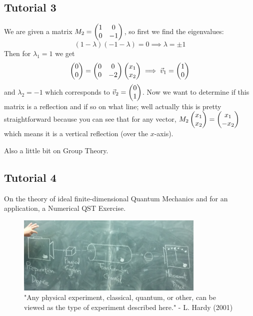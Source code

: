 \documentclass[english, 11pt]{article}
\begin{document}
     \subsection{Tutorial 3}

      We are given a matrix $M_2 = \left(\begin{matrix}1 & 0 \\ 0 & -1\end{matrix}\right)$, so first we find the eigenvalues:
      \[ (1-\lambda)(-1 - \lambda) = 0 \implies \lambda = \pm 1 \]
      Then for $\lambda_1 = 1$ we get
      \[ \left(\begin{matrix}0\\0\end{matrix}\right) = \left(\begin{matrix}0 & 0 \\ 0 & -2\end{matrix}\right)\left(\begin{matrix}x_1 \\ x_2\end{matrix}\right) \implies {\vec{v}}_1 = \left(\begin{matrix}1 \\ 0\end{matrix}\right) \]
      and $\lambda_2 = -1$ which corresponds to ${\vec{v}}_2 = \left(\begin{matrix}0 \\ 1\end{matrix}\right)$. Now we want to determine if this matrix is a reflection and if so on what line; well actually this is pretty straightforward because you can see that for any vector, $M_2\left(\begin{matrix}x_1\\x_2\end{matrix}\right) = \left(\begin{matrix}x_1\\-x_2\end{matrix}\right)$ which means it is a vertical reflection (over the $x$-axis).
      \newline

      Also a little bit on Group Theory.

     \subsection{Tutorial 4}

      On the theory of ideal finite-dimensional Quantum Mechanics and for an application, a Numerical QST Exercise.

      \begin{figure}[b!]
            \centering
            \includegraphics[width=0.8\textwidth]{any_physics.png}
            \caption{"Any physical experiment, classical, quantum, or other, can be viewed as the type of experiment described here." - L. Hardy (2001)}
      \end{figure}
\end{document}
